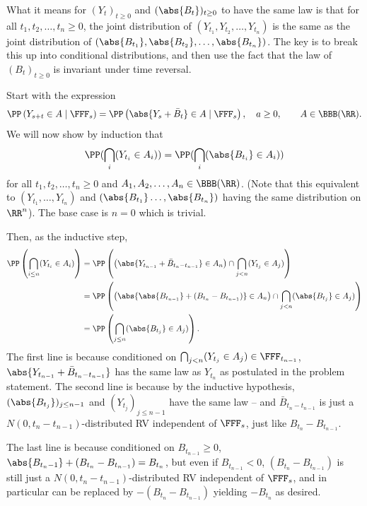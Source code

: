 \documentclass{scrartcl}
\begin{document}
What it means for $(Y_t)_{t\geq 0}$ and $(\abs{B_t})_{t\geq 0}$ to have the same law is that for all $t_1, t_2, \ldots, t_n \geq 0$, the joint distribution of $(Y_{t_1}, Y_{t_2}, \ldots, Y_{t_n})$ is the same as the joint distribution of $(\abs{B_{t_1}}, \abs{B_{t_2}}, \ldots, \abs{B_{t_n}})$. The key is to break this up into conditional distributions, and then use the fact that the law of $(B_t)_{t\geq 0}$ is invariant under time reversal.

Start with the expression
\[
    \PP\left(Y_{s+t} \in A \mid \FFF_s\right) = \PP\left(\abs{Y_s + \bar{B}_t} \in A \mid \FFF_s\right), \quad a \geq 0,\qquad A \in \BBB(\RR).
\]
We will now show by induction that
\[
    \PP(\bigcap_i (Y_{t_i}\in A_i)) = \PP(\bigcap_i (\abs{B_{t_i}}\in A_i))
\]
for all $t_1, t_2, \ldots, t_n \geq 0$ and $A_1, A_2, \ldots, A_n \in \BBB(\RR)$. (Note that this equivalent to $(Y_{t_1},\dots, Y_{t_n})$ and $(\abs{B_{t_1}}\dots, \abs{B_{t_n}})$ having the same distribution on $\RR^n$). The base case is $n = 0$ which is trivial.

Then, as the inductive step,
\begin{align*}
    \PP\left(\bigcap_{i\leq n} (Y_{t_i}\in A_i)\right) &= \PP\left(\left(\abs{Y_{t_{n - 1}} +\bar{B}_{t_n - t_{n-1}}}\in A_n\right)\cap \bigcap_{j < n} (Y_{t_j}\in A_j)\right)\\
    &= \PP\left(\left(\abs{\abs{B_{t_{n - 1}}} +(B_{t_n} - B_{t_{n-1}})}\in A_n\right)\cap \bigcap_{j < n} (\abs{B_{t_j}}\in A_j)\right)\\
    &= \PP\left(\bigcap_{j\leq n} (\abs{B_{t_j}}\in A_j)\right).
\end{align*}
The first line is because conditioned on $\bigcap_{j < n} (Y_{t_j}\in A_j) \in \FFF_{t_{n-1}}$, $\abs{Y_{t_{n - 1}} +\bar{B}_{t_n - t_{n-1}}}$ has the same law as $Y_{t_n}$ as postulated in the problem statement. The second line is because by the inductive hypothesis, $(\abs{B_{t_j}})_{j\leq n-1}$ and $(Y_{t_j})_{j\leq n-1}$ have the same law -- and $\bar{B}_{t_n - t_{n-1}}$ is just a $N(0, t_n - t_{n-1})$-distributed RV independent of $\FFF_s$, just like $B_{t_n} - B_{t_{n-1}}$.

The last line is because conditioned on $B_{t_{n-1}} \geq 0$, $\abs{B_{t_n-1}} + (B_{t_n} - B_{t_{n-1}}) = B_{t_n}$, but even if $B_{t_{n-1}} < 0$, $(B_{t_n} - B_{t_{n-1}})$ is still just a $N(0, t_n - t_{n-1})$-distributed RV independent of $\FFF_s$, and in particular can be replaced by $-(B_{t_n} - B_{t_{n-1}})$ yielding $-B_{t_n}$ as desired.
 
\end{document}
